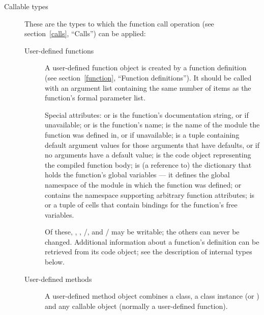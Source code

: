 \begin{description}
\item[Callable types]
These are the types to which the function call
operation (see section~\ref{calls}, ``Calls'') can be applied:

\begin{description}

\item[User-defined functions]
A user-defined function object is created by a function definition
(see section~\ref{function}, ``Function definitions'').  It should be
called with an argument
list containing the same number of items as the function's formal
parameter list.

Special attributes:  or  is the
function's documentation string, or  if unavailable;
 or  is the function's name;
 is the name of the module the function was defined
in, or  if unavailable;
 is a tuple containing default argument values for
those arguments that have defaults, or  if no arguments
have a default value;  is the code object representing
the compiled function body;  is (a reference to)
the dictionary that holds the function's global variables --- it
defines the global namespace of the module in which the function was
defined;  or  contains the
namespace supporting arbitrary function attributes;
 is  or a tuple of cells that contain
bindings for the function's free variables.

Of these, , , 
/, and
/ may be writable; the
others can never be changed.  Additional information about a
function's definition can be retrieved from its code object; see the
description of internal types below.


\item[User-defined methods]
A user-defined method object combines a class, a class instance (or
) and any callable object (normally a user-defined
function).


\end{description}
\end{description}
